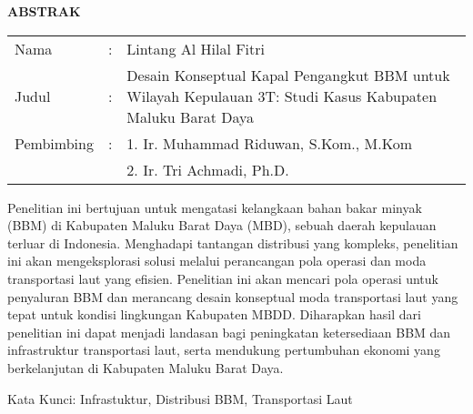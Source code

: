 \begin{center}
  \large\textbf{ABSTRAK}
\end{center}

\vspace{2ex}

\begingroup
  \setlength{\tabcolsep}{0pt}
  \noindent
  \begin{tabularx}{\textwidth}{l >{\centering}m{2em} X}
    Nama        &:& Lintang Al Hilal Fitri \\
    Judul       &:&	Desain Konseptual Kapal Pengangkut BBM untuk Wilayah Kepulauan 3T: Studi Kasus Kabupaten Maluku Barat Daya \\
    Pembimbing  &:& 1. Ir. Muhammad Riduwan, S.Kom., M.Kom   \\
                & & 2. Ir. Tri Achmadi, Ph.D. \\
  \end{tabularx}
\endgroup

Penelitian ini bertujuan untuk mengatasi kelangkaan bahan bakar minyak (BBM) di Kabupaten Maluku Barat Daya (MBD), sebuah daerah kepulauan terluar di Indonesia. Menghadapi tantangan distribusi yang kompleks, penelitian ini akan mengeksplorasi solusi melalui perancangan pola operasi dan moda transportasi laut yang efisien. Penelitian ini akan mencari pola operasi untuk penyaluran BBM dan merancang desain konseptual moda transportasi laut yang tepat untuk kondisi lingkungan Kabupaten MBDD. Diharapkan hasil dari penelitian ini dapat menjadi landasan bagi peningkatan ketersediaan BBM dan infrastruktur transportasi laut, serta mendukung pertumbuhan ekonomi yang berkelanjutan di Kabupaten Maluku Barat Daya.

Kata Kunci: Infrastuktur, Distribusi BBM, Transportasi Laut
